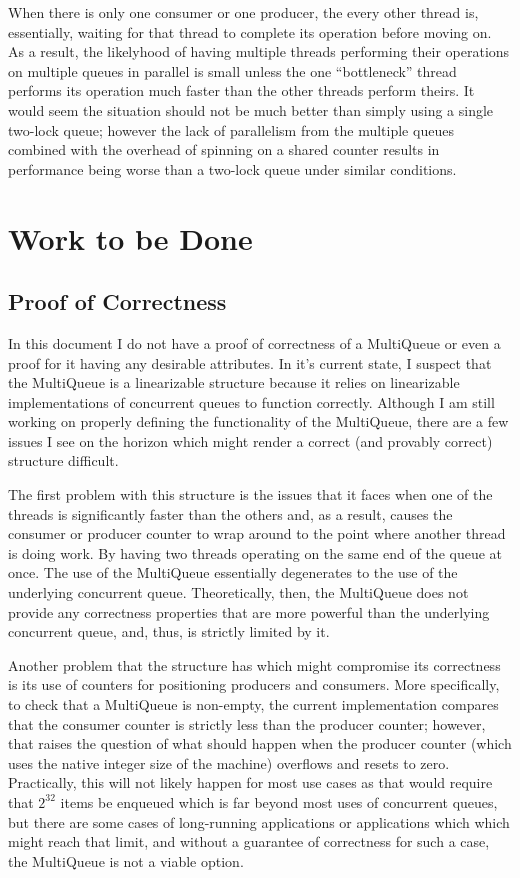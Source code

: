 \documentclass[12pt]{report}
\begin{document}
When there is only one consumer or one producer, the every other thread is,
essentially, waiting for that thread to complete its operation before moving
on. As a result, the likelyhood of having multiple threads performing their
operations on multiple queues in parallel is small unless the one
``bottleneck'' thread performs its operation much faster than the other threads
perform theirs. It would seem the situation should not be much better than
simply using a single two-lock queue; however the lack of parallelism from the
multiple queues combined with the overhead of spinning on a shared counter
results in performance being worse than a two-lock queue under similar
conditions.


\section{Work to be Done}
\subsection{Proof of Correctness}
In this document I do not have a proof of correctness of a MultiQueue or even a
proof for it having any desirable attributes. In it's current state, I suspect
that the MultiQueue is a linearizable structure because it relies on
linearizable implementations of concurrent queues to function correctly.
Although I am still working on properly defining the functionality of the
MultiQueue, there are a few issues I see on the horizon which might render a
correct (and provably correct) structure difficult.

The first problem with this structure is the issues that it faces when one of
the threads is significantly faster than the others and, as a result, causes
the consumer or producer counter to wrap around to the point where another
thread is doing work. By having two threads operating on the same end of the
queue at once. The use of the MultiQueue essentially degenerates to the use of
the underlying concurrent queue. Theoretically, then, the MultiQueue does not
provide any correctness properties that are more powerful than the underlying
concurrent queue, and, thus, is strictly limited by it.

Another problem that the structure has which might compromise its correctness
is its use of counters for positioning producers and consumers. More
specifically, to check that a MultiQueue is non-empty, the current
implementation compares that the consumer counter is strictly less than the
producer counter; however, that raises the question of what should happen when
the producer counter (which uses the native integer size of the machine)
overflows and resets to zero. Practically, this will not likely happen for most
use cases as that would require that $2^{32}$ items be enqueued which is far
beyond most uses of concurrent queues, but there are some cases of long-running
applications or applications which which might reach that limit, and without a
guarantee of correctness for such a case, the MultiQueue is not a viable
option.
\end{document}
